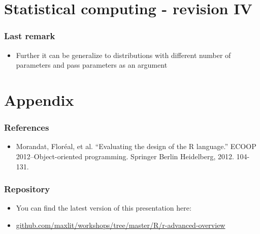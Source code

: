 \documentclass[bigger]{beamer}
\begin{document}
\section{Statistical computing - revision IV}
\label{sec-9}
\begin{frame}
\frametitle{Last remark}
\label{sec-9-1}
\begin{itemize}

\item Further it can be generalize to distributions with different number of parameters and pass parameters as an argument
\label{sec-9-1-1}%
\end{itemize} %
\end{frame}
\section{Appendix}
\label{sec-10}
\begin{frame}
\frametitle{References}
\label{sec-10-1}
\begin{itemize}

\item Morandat, Floréal, et al. ``Evaluating the design of the R language.'' ECOOP 2012–Object-oriented programming. Springer Berlin Heidelberg, 2012. 104-131.
\label{sec-10-1-1}%
\end{itemize} %
\end{frame}
\begin{frame}
\frametitle{Repository}
\label{sec-10-2}
\begin{itemize}

\item You can find the latest version of this presentation here:
\label{sec-10-2-1}%

\item \hyperref[github.com-maxlit-workshops-tree-master-R-r-advanced-overview]{github.com/maxlit/workshops/tree/master/R/r-advanced-overview}
\label{sec-10-2-2}%

\end{itemize} %
\end{frame}
\end{document}
